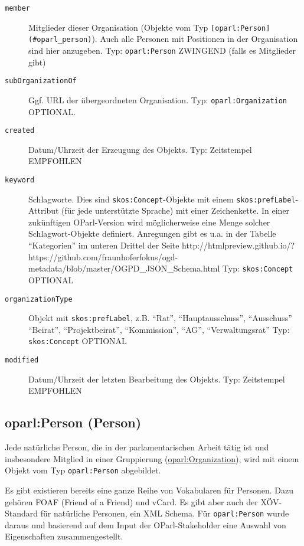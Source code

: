 \documentclass[,a4paper]{article}
\begin{document}
\begin{description}
\item[\texttt{member}]
Mitglieder dieser Organisation (Objekte vom Typ
\texttt{{[}oparl:Person{]}(\#oparl\_person)}). Auch alle Personen mit
Positionen in der Organisation sind hier anzugeben. Typ:
\texttt{oparl:Person} ZWINGEND (falls es Mitglieder gibt)
\item[\texttt{subOrganizationOf}]
Ggf. URL der übergeordneten Organisation. Typ:
\texttt{oparl:Organization} OPTIONAL.
\item[\texttt{created}]
Datum/Uhrzeit der Erzeugung des Objekts. Typ: Zeitstempel EMPFOHLEN
\item[\texttt{keyword}]
Schlagworte. Dies sind \texttt{skos:Concept}-Objekte mit einem
\texttt{skos:prefLabel}-Attribut (für jede unterstützte Sprache) mit
einer Zeichenkette. In einer zukünftigen OParl-Version wird
möglicherweise eine Menge solcher Schlagwort-Objekte definiert.
Anregungen gibt es u.a. in der Tabelle ``Kategorien'' im unteren Drittel
der Seite
http://htmlpreview.github.io/?https://github.com/fraunhoferfokus/ogd-metadata/blob/master/OGPD\_JSON\_Schema.html
Typ: \texttt{skos:Concept} OPTIONAL
\item[\texttt{organizationType}]
Objekt mit \texttt{skos:prefLabel}, z.B. ``Rat'', ``Hauptausschuss'',
``Ausschuss'' ``Beirat'', ``Projektbeirat'', ``Kommission'', ``AG'',
``Verwaltungsrat'' Typ: \texttt{skos:Concept} OPTIONAL
\item[\texttt{modified}]
Datum/Uhrzeit der letzten Bearbeitung des Objekts. Typ: Zeitstempel
EMPFOHLEN
\end{description}

\subsection{oparl:Person (Person)}\label{oparlux5fperson}

Jede natürliche Person, die in der parlamentarischen Arbeit tätig ist
und insbesondere Mitglied in einer Gruppierung
(\hyperref[oparlux5forganization]{oparl:Organization}), wird mit einem
Objekt vom Typ \texttt{oparl:Person} abgebildet.

Es gibt existieren bereits eine ganze Reihe von Vokabularen für
Personen. Dazu gehören FOAF (Friend of a Friend) und vCard. Es gibt aber
auch der XÖV-Standard für natürliche Personen, ein XML Schema. Für
\texttt{oparl:Person} wurde daraus und basierend auf dem Input der
OParl-Stakeholder eine Auswahl von Eigenschaften zusammengestellt.
\end{document}
